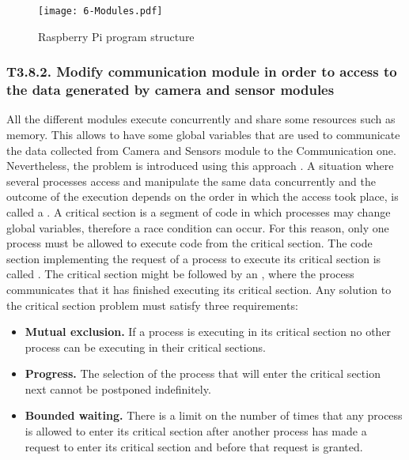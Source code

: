 \begin{figure}[!h]
	\begin{center}
		\texttt{[image: 6-Modules.pdf]}
		\caption{Raspberry Pi program structure}
		\label{fig:6-Modules}
	\end{center}
\end{figure}


\subsubsection{T3.8.2. Modify communication module in order to access to the data generated by camera and sensor modules}
All the different modules execute concurrently and share some resources such as memory. This allows to have some global variables that are used to communicate the data collected from Camera and Sensors module to the Communication one. Nevertheless, the  problem is introduced using this approach \cite{SGG06}. A situation where several processes access and manipulate the same data concurrently and the outcome of the execution depends on the order in which the access took place, is called a . A critical section is a segment of code in which processes may change global variables, therefore a race condition can occur. For this reason, only one process must be allowed to execute code from the critical section. The code section implementing the request of a process to execute its critical section is called . The critical section might be followed by an , where the process communicates that it has finished executing its critical section. Any solution to the critical section problem must satisfy three requirements:
\begin{itemize}
	\item \textbf{Mutual exclusion.} If a process is executing in its critical section no other process can be executing in their critical sections.
	\item \textbf{Progress.} The selection of the process that will enter the critical section next cannot be postponed indefinitely.
	\item \textbf{Bounded waiting.} There is a limit on the number of times that any process is allowed to enter its critical section after another process has made a request to enter its critical section and before that request is granted.
\end{itemize}

